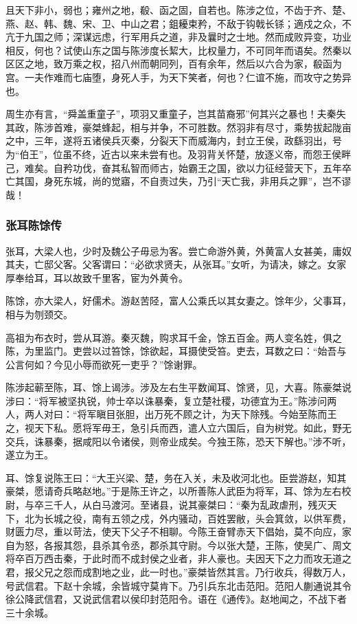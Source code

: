\documentclass[]{article}
\begin{document}
且天下非小，弱也；雍州之地，殽、函之固，自若也。陈涉之位，不齿于齐、楚、燕、赵、韩、魏、宋、卫、中山之君；鉏耰束矜，不敌于钩戟长铩；適戍之众，不亢于九国之师；深谋远虑，行军用兵之道，非及曩时之士地。然而成败异变，功业相反，何也？试使山东之国与陈涉度长絜大，比权量力，不可同年而语矣。然秦以区区之地，致万乘之权，招八州而朝同列，百有余年，然后以六合为家，殽函为宫。一夫作难而七庙堕，身死人手，为天下笑者，何也？仁谊不施，而攻守之势异也。

周生亦有言，``舜盖重童子''，项羽又重童子，岂其苗裔邪''何其兴之暴也！夫秦失其政，陈涉首难，豪桀蜂起，相与并争，不可胜数。然羽非有尽寸，乘势拔起陇亩之中，三年，遂将五诸侯兵灭秦，分裂天下而威海内，封立王侯，政繇羽出，号为``伯王''，位虽不终，近古以来未尝有也。及羽背关怀楚，放逐义帝，而怨王侯畔己，难矣。自矜功伐，奋其私智而师古，始霸王之国，欲以力征经营天下，五年卒亡其国，身死东城，尚的觉寤，不自责过失，乃引``天亡我，非用兵之罪''，岂不谬哉！

\hypertarget{header-n3472}{%
\subsubsection{张耳陈馀传}\label{header-n3472}}

张耳，大梁人也，少时及魏公子毋忌为客。尝亡命游外黄，外黄富人女甚美，庸奴其夫，亡邸父客。父客谓曰：``必欲求贤夫，从张耳。''女听，为请决，嫁之。女家厚奉给耳，耳以故致千里客，宦为外黄令。

陈馀，亦大梁人，好儒术。游赵苦陉，富人公乘氏以其女妻之。馀年少，父事耳，相与为刎颈交。

高祖为布衣时，尝从耳游。秦灭魏，购求耳千金，馀五百金。两人变名姓，俱之陈，为里监门。吏尝以过笞馀，馀欲起，耳摄使受笞。吏去，耳数之曰：``始吾与公言何如？今见小辱而欲死一吏乎？''馀谢罪。

陈涉起蕲至陈，耳、馀上谒涉。涉及左右生平数闻耳、馀贤，见，大喜。陈豪桀说涉曰：``将军被坚执锐，帅士卒以诛暴秦，复立楚社稷，功德宜为王。''陈涉问两人，两人对曰：``将军瞋目张胆，出万死不顾之计，为天下除残。今始至陈而王之，视天下私。愿将军毋王，急引兵而西，遣人立六国后，自为树党。如此，野无交兵，诛暴秦，据咸阳以令诸侯，则帝业成矣。今独王陈，恐天下解也。''涉不听，遂立为王。

耳、馀复说陈王曰：``大王兴梁、楚，务在入关，未及收河北也。臣尝游赵，知其豪桀，愿请奇兵略赵地。''于是陈王许之，以所善陈人武臣为将军，耳、馀为左右校尉，与卒三千人，从白马渡河。至诸县，说其豪桀曰：``秦为乱政虐刑，残灭天下，北为长城之役，南有五领之戍，外内骚动，百姓罢敝，头会箕敛，以供军费，财匮力尽，重以苛法，使天下父子不相聊。今陈王奋臂赤天下倡始，莫不向应，家自为怒，各报其怨，县杀其令丞，郡杀其守尉。今以张大楚，王陈，使吴广、周文将卒百万西击秦，于此时而不成封侯之业者，非人豪也。夫因天下之力而攻无道之君，报父兄之怨而成割地之业，此一时也。''豪桀皆然其言。乃行收兵，得数万人，号武信君。下赵十余城，余皆城守莫肯下。乃引兵东北击范阳。范阳人蒯通说其令徐公降武信君，又说武信君以侯印封范阳令。语在《通传》。赵地闻之，不战下者三十余城。
\end{document}
